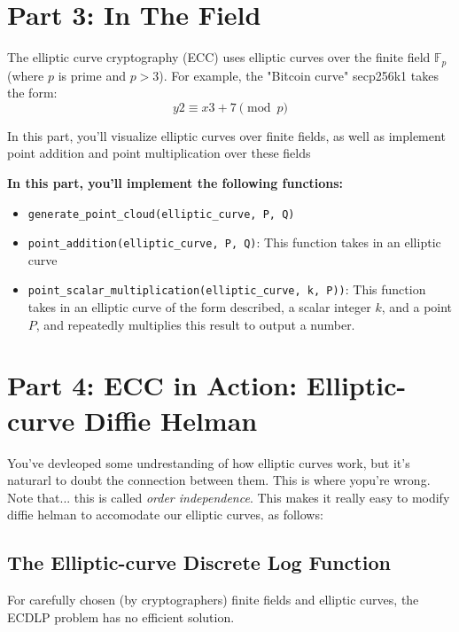 \documentclass{article}
\begin{document}
\section*{Part 3: In The Field}
The elliptic curve cryptography (ECC) uses elliptic curves over the finite field $\mathbb{F}_{p}$ (where $p$ is prime and $p > 3$). For example, the "Bitcoin curve" secp256k1 takes the form:
$$y2 \equiv x3 + 7 \pmod{p}$$


\begin{tcolorbox}
    In this part, you'll visualize elliptic curves over finite fields, as well as implement point addition and point multiplication over these fields

    
    \textbf{In this part, you'll implement the following functions:}
    \begin{itemize}
        \item \lstinline{generate_point_cloud(elliptic_curve, P, Q)}
        \item \lstinline{point_addition(elliptic_curve, P, Q)}: This function takes in an elliptic curve 
        \item \lstinline{point_scalar_multiplication(elliptic_curve, k, P))}: This function takes in an elliptic curve of the form described, a scalar integer $k$, and a point $P$, and repeatedly multiplies this result to output a number.
    \end{itemize}
    
\end{tcolorbox}

\section*{Part 4: ECC in Action: Elliptic-curve Diffie Helman}

You've devleoped some undrestanding of how elliptic curves work, but it's naturarl to doubt the connection between them. This is where yopu're wrong. Note that... this is called \textit{order independence}. This makes it really easy to modify diffie helman to accomodate our elliptic curves, as follows:


\subsection*{The Elliptic-curve Discrete Log Function}

For carefully chosen (by cryptographers) finite fields and elliptic curves, the ECDLP problem has no efficient solution.
\end{document}
